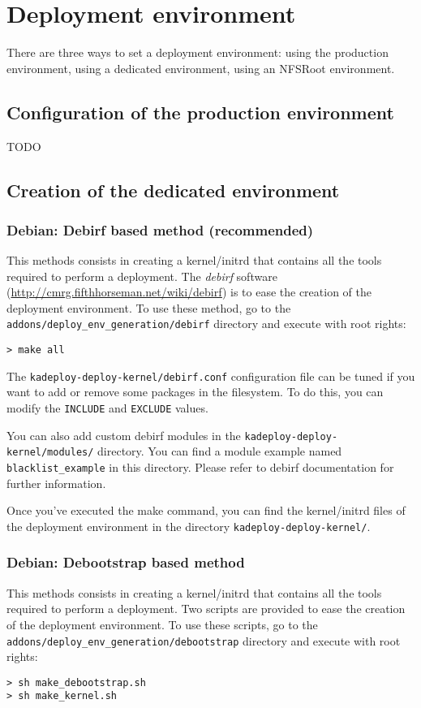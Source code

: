 \documentclass[a4wide,10pt,oneside]{book}
\begin{document}
\section{Deployment environment}\label{sec:deployenv}
There are three ways to set a deployment environment: using the production environment, using a dedicated environment, using an NFSRoot environment.

\subsection{Configuration of the production environment}
TODO
\subsection{Creation of the dedicated environment}
\subsubsection{Debian: Debirf based method (recommended)}
This methods consists in creating a kernel/initrd that contains all the tools required to perform a deployment. The \emph{debirf} software (\url{http://cmrg.fifthhorseman.net/wiki/debirf}) is to ease the creation of the deployment environment. To use these method, go to the \texttt{addons/deploy\_env\_generation/debirf} directory and execute with root rights:
\begin{small}
\begin{verbatim}
> make all
\end{verbatim}
\end{small}

The \texttt{kadeploy-deploy-kernel/debirf.conf} configuration file can be tuned if you want to add or remove some packages in the filesystem. To do this, you can modify the \texttt{INCLUDE} and \texttt{EXCLUDE} values.

You can also add custom debirf modules in the \texttt{kadeploy-deploy-kernel/modules/} directory. You can find a module example named \texttt{blacklist\_example} in this directory. Please refer to debirf documentation for further information.

Once you've executed the make command, you can find the kernel/initrd files of the deployment environment in the directory \texttt{kadeploy-deploy-kernel/}.

\subsubsection{Debian: Debootstrap based method}
This methods consists in creating a kernel/initrd that contains all the tools required to perform a deployment. Two scripts are provided to ease the creation of the deployment environment. To use these scripts, go to the \texttt{addons/deploy\_env\_generation/debootstrap} directory and execute with root rights:
\begin{small}
\begin{verbatim}
> sh make_debootstrap.sh
> sh make_kernel.sh
\end{verbatim}
\end{small}
\end{document}
